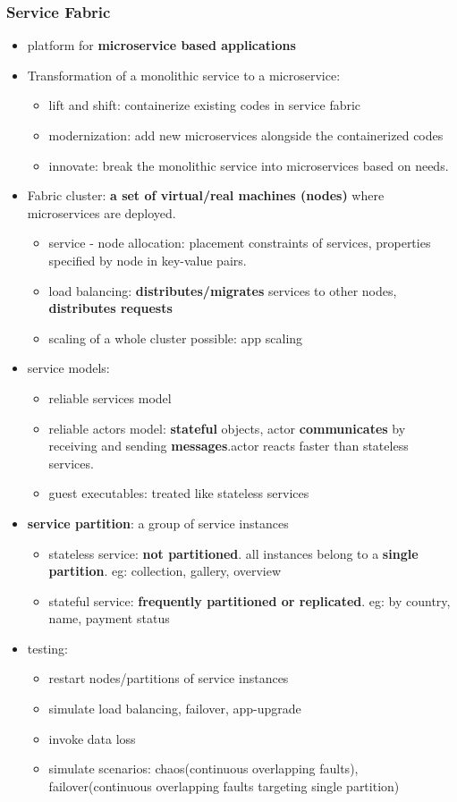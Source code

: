 \subsubsection{Service Fabric}
\begin{itemize}
	\item platform for \textbf{microservice based applications}
	\item Transformation of a monolithic service to a microservice:
	\begin{itemize}
		\item lift and shift: containerize existing codes in service fabric
		\item modernization: add new microservices alongside the containerized codes
		\item innovate: break the monolithic service into microservices based on needs.
	\end{itemize} 
	\item Fabric cluster: \textbf{a set of virtual/real machines (nodes)} where microservices are deployed.
	\begin{itemize}
		\item service - node allocation: placement constraints of services, properties specified by node in key-value pairs.
		\item load balancing: \textbf{distributes/migrates} services to other nodes, \textbf{distributes requests}
		\item scaling of a whole cluster possible: app scaling
	\end{itemize}
	\item service models:
	\begin{itemize}
		\item reliable services model
		\item reliable actors model: \textbf{stateful} objects, actor \textbf{communicates} by receiving and sending \textbf{messages}.actor reacts faster than stateless services.
		\item guest executables: treated like stateless services
	\end{itemize}
	\item \textbf{service partition}: a group of service instances 
	\begin{itemize}
		\item stateless service: \textbf{not partitioned}. all instances belong to a \textbf{single partition}. eg: collection, gallery, overview
		\item stateful service: \textbf{frequently partitioned or replicated}. eg: by country, name, payment status  
	\end{itemize}
	\item testing:
	\begin{itemize}
		\item restart nodes/partitions of service instances
		\item simulate load balancing, failover, app-upgrade
		\item invoke data loss
		\item simulate scenarios: chaos(continuous overlapping faults), failover(continuous overlapping faults targeting single partition)
	\end{itemize}
\end{itemize}